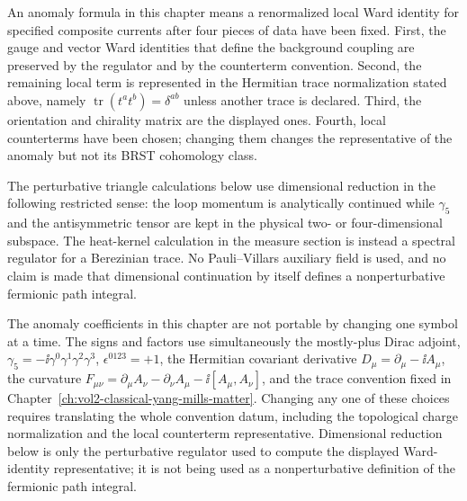 \begin{definition}
\label{def:anomaly-representative-conventions}
An anomaly formula in this chapter means a renormalized local Ward identity
for specified composite currents after four pieces of data have been fixed.
First, the gauge and vector Ward identities that define the background
coupling are preserved by the regulator and by the counterterm convention.
Second, the remaining local term is represented in the Hermitian trace
normalization stated above, namely
\(\operatorname{tr}(t^at^b)=\delta^{ab}\) unless another trace is declared.
Third, the orientation and chirality matrix are the displayed ones.  Fourth,
local counterterms have been chosen; changing them changes the representative
of the anomaly but not its BRST cohomology class.

The perturbative triangle calculations below use dimensional reduction in
the following restricted sense: the loop momentum is analytically continued
while \(\gamma_5\) and the antisymmetric tensor are kept in the physical
two- or four-dimensional subspace.  The heat-kernel calculation in the
measure section is instead a spectral regulator for a Berezinian trace.  No
Pauli--Villars auxiliary field is used, and no claim is made that
dimensional continuation by itself defines a nonperturbative fermionic path
integral.
\end{definition}

\begin{warning}
The anomaly coefficients in this chapter are not portable by changing one
symbol at a time.  The signs and factors use simultaneously the mostly-plus
Dirac adjoint, \(\gamma_5=-\ii\gamma^0\gamma^1\gamma^2\gamma^3\),
\(\epsilon^{0123}=+1\), the Hermitian covariant derivative
\(D_\mu=\partial_\mu-\ii A_\mu\), the curvature
\(F_{\mu\nu}=\partial_\mu A_\nu-\partial_\nu A_\mu-\ii[A_\mu,A_\nu]\), and
the trace convention fixed in Chapter~\ref{ch:vol2-classical-yang-mills-matter}.
Changing any one of these choices requires translating the whole convention
datum, including the topological charge normalization and the local
counterterm representative.  Dimensional reduction below is only the
perturbative regulator used to compute the displayed Ward-identity
representative; it is not being used as a nonperturbative definition of the
fermionic path integral.
\end{warning}

